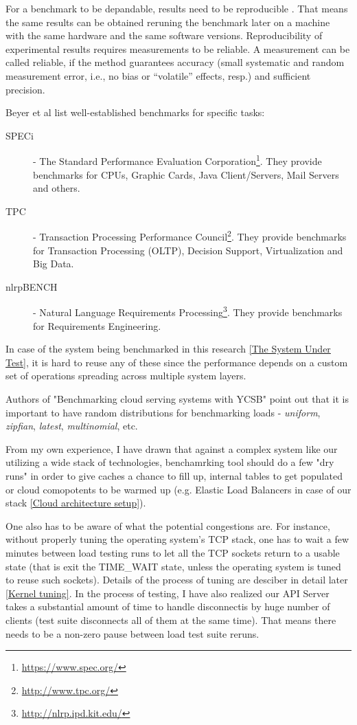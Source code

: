 \documentclass{uvamscse}
\begin{document}
For a benchmark to be depandable, results need to be reproducible \cite{BornBen}. That means the same results can be obtained reruning the benchmark later on a machine with the same hardware and the same software versions. Reproducibility of experimental results requires measurements to be reliable. A measurement can be called reliable, if the method guarantees accuracy (small systematic and random measurement error, i.e., no bias or “volatile” effects, resp.) and sufficient precision.

Beyer et al \cite{BenRM} list well-established benchmarks for specific tasks:
\begin{description}
  \item[SPECi]
  - The Standard Performance Evaluation Corporation\footnote{\url{https://www.spec.org/}}. They provide benchmarks for CPUs, Graphic Cards, Java Client/Servers, Mail Servers and others.
  \item[TPC]
  - Transaction Processing Performance Council\footnote{\url{http://www.tpc.org/}}. They provide benchmarks for Transaction Processing (OLTP), Decision Support, Virtualization and Big Data.
  \item[nlrpBENCH]
  - Natural Language Requirements Processing\footnote{\url{http://nlrp.ipd.kit.edu/}}. They provide benchmarks for Requirements Engineering.
\end{description}

In case of the system being benchmarked in this research \ref{The System Under Test}, it is hard to reuse any of these since the performance depends on a custom set of operations spreading across multiple system layers.

Authors of "Benchmarking cloud serving systems with YCSB" \cite{Ycsb} point out that it is important to have random distributions for benchmarking loads - \textit{uniform}, \textit{zipfian}, \textit{latest}, \textit{multinomial}, etc.

From my own experience, I have drawn that against a complex system like our utilizing a wide stack of technologies, benchamrking tool should do a few "dry runs" in order to give caches a chance to fill up, internal tables to get populated or cloud comopotents to be warmed up (e.g. Elastic Load Balancers in case of our stack \ref{Cloud architecture setup}).

One also has to be aware of what the potential congestions are. For instance, without properly tuning the operating system's TCP stack, one has to wait a few minutes between load testing runs to let all the TCP sockets return to a usable state (that is exit the TIME\_WAIT state, unless the operating system is tuned to reuse such sockets). Details of the process of tuning are desciber in detail later \ref{Kernel tuning}. In the process of testing, I have also realized our API Server takes a substantial amount of time to handle disconnectis by huge number of clients (test suite disconnects all of them at the same time). That means there needs to be a non-zero pause between load test suite reruns.
\end{document}

